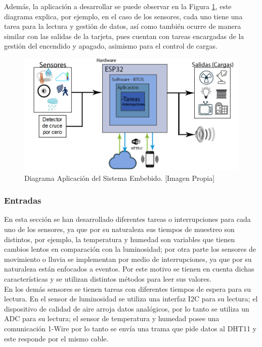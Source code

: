 Además, la aplicación a desarrollar se puede observar en la Figura \ref{fig:App}, este diagrama explica, por ejemplo, en el caso de los sensores, cada uno tiene una tarea para la lectura y gestión de datos, así como también ocurre de manera similar con las salidas de la tarjeta, pues cuentan con tareas encargadas de la gestión del encendido y apagado, asimismo para el control de cargas.\\

\begin{figure}[!t]
	\centering
	\caption[Diagrama Aplicación del Sistema Embebido.]{Diagrama Aplicación del Sistema Embebido. [Imagen Propia]}
	\label{fig:App}
	\includegraphics[width=0.7\linewidth]{Imagenes/B_Aplicacion}
\end{figure}

\subsubsection*{Entradas}

En esta sección se han desarrollado diferentes tareas o interrupciones para cada uno de los sensores, ya que por su naturaleza sus tiempos de muestreo son distintos, por ejemplo, la temperatura y humedad son variables que tienen cambios lentos en comparación con la luminosidad; por otra parte los sensores de movimiento o lluvia se implementan por medio de interrupciones, ya que por su naturaleza están enfocados a eventos. Por este motivo se tienen en cuenta dichas características y se utilizan distintos métodos para leer sus valores.\\

En los demás sensores se tienen tareas con diferentes tiempos de espera para su lectura. En el sensor de luminosidad se utiliza una interfaz I2C para su lectura; el dispositivo de calidad de aire arroja datos analógicos, por lo tanto se utiliza un ADC para su lectura; el sensor de temperatura y humedad posee una comunicación 1-Wire por lo tanto se envía una trama que pide datos al DHT11 y este responde por el mismo cable.\\



